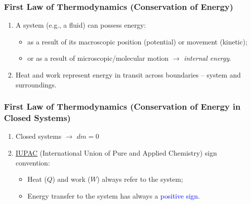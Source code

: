 \documentclass[10pt,compress]{beamer}
\begin{document}
\begin{frame}
 \frametitle{First Law of Thermodynamics (Conservation of Energy)}
   \begin{enumerate}
      \item<1-> A system (e.g., a fluid) can possess energy:
        \begin{itemize}
          \item<1-> as a result of its macroscopic position (potential) or movement (kinetic);
          \item<1-> or as a result of microscopic/molecular motion $\rightarrow$ {\it internal energy}.
        \end{itemize}

      \item<3-> Heat and work represent energy in transit across boundaries -- system and surroundings.

   \end{enumerate}
\normalsize
\end{frame}



\begin{frame}\label{Slide1}
 \frametitle{First Law of Thermodynamics (Conservation of Energy in Closed Systems)}
   \begin{enumerate} 
      \item<1-> Closed systems $\longrightarrow$ $dm = 0$
      \item<2-> \href{http://www.iupac.org/}{IUPAC} (International Union of Pure and Applied Chemistry) sign convention:
         \begin{itemize}
            \item<2-> Heat ($Q$) and work ($W$)  always refer to the system;
            \item<2-> Energy transfer to the system has always a \textcolor{blue}{positive sign}.
         \end{itemize}
   \end{enumerate}
\normalsize
\end{frame}
\end{document}
